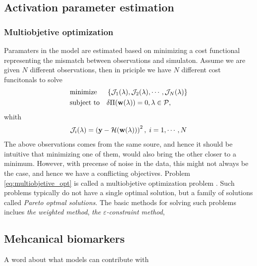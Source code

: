 \subsection{Activation parameter estimation}



\subsubsection{Multiobjetive optimization}
Paramaters in the model are estimated based on minimizing a cost
functional representing the mismatch between observations and simulaton.
Assume we are given $N$ different observations, then in priciple we
have $N$ different cost funcitonals to solve
\begin{equation}
  \begin{aligned}
    \label{eq:multiobjetive_opt}
    & \text{minimize}
    & &  \left\{ \mathcal{J}_1(\lambda), \mathcal{J}_2(\lambda), \cdots, \mathcal{J}_N(\lambda) \right\} \\
    & \text{subject to}
    & & \delta \Pi(\mathbf{w}(\lambda)) = 0, \lambda \in \mathcal{P},
  \end{aligned}
\end{equation}
whith 
\begin{align}
  \mathcal{J}_i(\lambda) = \left( \mathbf{y} - \mathcal{H}(\mathbf{w}(\lambda)) \right)^2, \; i = 1,\cdots, N
\end{align}
The above observations comes from the same soure, and hence it should
be intuitive that minimizing one of them, would also bring the other
closer to a minimum. However, with precense of noise in the data,
this might not always be the case, and hence we have a conflicting
objectives. Problem \eqref{eq:multiobjetive_opt} is called a
multiobjetive optimization problem \cite{deb2016multi}. Such problems
typically do not have a single optimal solution, but a family of
solutions called \emph{Pareto optmal solutions}. The basic methods for
solving such problems inclues \emph{the weighted method}, \emph{the
  $\varepsilon$-constraint method}, 




\subsection{Mehcanical biomarkers}
A word about what models can contribute with




